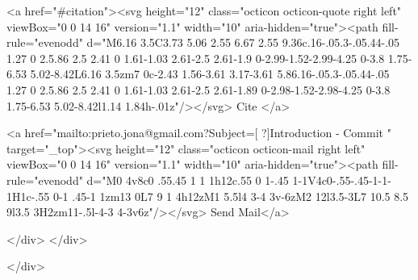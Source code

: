       <a  href="#citation"><svg height="12" class="octicon octicon-quote right left" viewBox="0 0 14 16" version="1.1" width="10" aria-hidden="true"><path fill-rule="evenodd" d="M6.16 3.5C3.73 5.06 2.55 6.67 2.55 9.36c.16-.05.3-.05.44-.05 1.27 0 2.5.86 2.5 2.41 0 1.61-1.03 2.61-2.5 2.61-1.9 0-2.99-1.52-2.99-4.25 0-3.8 1.75-6.53 5.02-8.42L6.16 3.5zm7 0c-2.43 1.56-3.61 3.17-3.61 5.86.16-.05.3-.05.44-.05 1.27 0 2.5.86 2.5 2.41 0 1.61-1.03 2.61-2.5 2.61-1.89 0-2.98-1.52-2.98-4.25 0-3.8 1.75-6.53 5.02-8.42l1.14 1.84h-.01z"/></svg> Cite
      </a>

      <a href="mailto:prieto.jona@gmail.com?Subject=[ ?]Introduction - Commit " target="_top"><svg height="12" class="octicon octicon-mail right left" viewBox="0 0 14 16" version="1.1" width="10" aria-hidden="true"><path fill-rule="evenodd" d="M0 4v8c0 .55.45 1 1 1h12c.55 0 1-.45 1-1V4c0-.55-.45-1-1-1H1c-.55 0-1 .45-1 1zm13 0L7 9 1 4h12zM1 5.5l4 3-4 3v-6zM2 12l3.5-3L7 10.5 8.5 9l3.5 3H2zm11-.5l-4-3 4-3v6z"/></svg> Send Mail</a>

    </div>
  </div>

</div>




